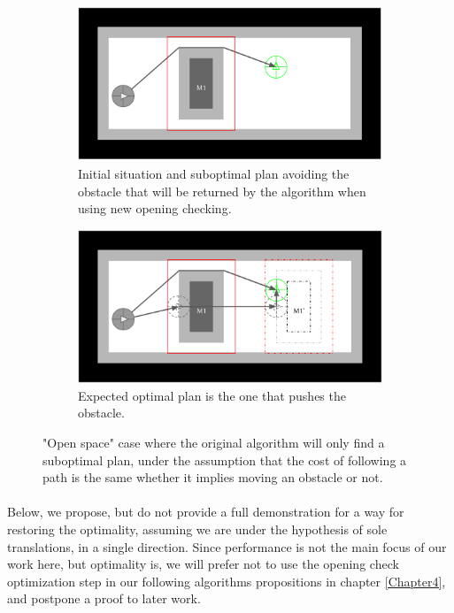 \begin{figure}[H]
\centering
\begin{subfigure}{.48\textwidth}
  \centering
  \includegraphics[width=\linewidth]{Figures/Check_New_Opening/openspace_original.png}
  \caption{Initial situation and suboptimal plan avoiding the obstacle that will be returned by the algorithm when using new opening checking.}
  \label{fig:openspace_original}
\end{subfigure}\hspace*{\fill}
\begin{subfigure}{.48\textwidth}
  \centering
  \includegraphics[width=\linewidth]{Figures/Check_New_Opening/openspace_optimal_path.png}
  \caption{Expected optimal plan is the one that pushes the obstacle.}
  \label{fig:openspace_optimal_path}
\end{subfigure}
\caption{"Open space" case where the original algorithm will only find a suboptimal plan, under the assumption that the cost of following a path is the same whether it implies moving an obstacle or not.}
\label{fig:openspace_case}
\end{figure}

\paragraph{}\label{check_opening_solution} Below, we propose, but do not provide a full demonstration for a way for restoring the optimality, assuming we are under the hypothesis of sole translations, in a single direction. Since performance is not the main focus of our work here, but optimality is, we will prefer not to use the opening check optimization step in our following algorithms propositions in chapter \ref{Chapter4}, and postpone a proof to later work.

